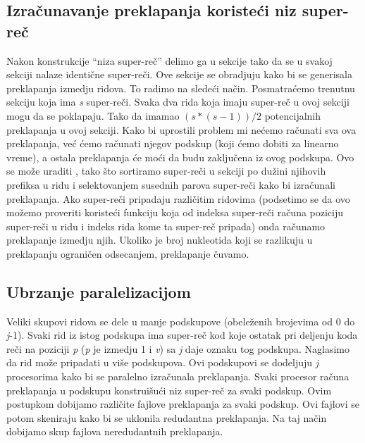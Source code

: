 \documentclass[a4paper]{article}
\begin{document}
{\subsection{Izračunavanje preklapanja koristeći niz super-reč}
\label{subsec:ipknsr}
\indent Nakon konstrukcije ``niza super-reč'' delimo ga u sekcije tako da se u svakoj sekciji nalaze identične super-reči. Ove sekcije se obradjuju kako bi se generisala preklapanja izmedju ridova. To radimo na sledeći način. Posmatraćemo trenutnu sekciju koja ima \textit{s} super-reči. Svaka dva rida koja imaju super-reč u ovoj sekciji mogu da se poklapaju. Tako da imamao \((s*(s-1))/2\) potencijalnih preklapanja u ovoj sekciji. Kako bi uprostili problem mi nećemo računati sva ova preklapanja, već ćemo računati njegov podskup (koji ćemo dobiti za linearno vreme), a ostala preklapanja će moći da budu zaključena iz ovog podskupa. Ovo se može uraditi , tako što sortiramo super-reči u sekciji po dužini njihovih prefiksa u ridu i selektovanjem susednih parova super-reči kako bi izračunali preklapanja. Ako super-reči pripadaju različitim ridovima (podsetimo se da ovo možemo proveriti koristeći funkciju koja od indeksa super-reči računa poziciju super-reči u ridu i indeks rida kome ta super-reč pripada) onda računamo preklapanje izmedju njih. Ukoliko je broj nukleotida koji se razlikuju u preklapanju ograničen odsecanjem, preklapanje čuvamo.
\subsection{Ubrzanje paralelizacijom}
\label{subsec:up}
Veliki skupovi ridova se dele u manje podskupove (obeleženih brojevima od 0 do \textit{j}-1). Svaki rid iz istog podskupa ima super-reč kod koje ostatak pri deljenju koda reči na poziciji \textit{p} (\textit{p} je izmedju 1 i \textit{v}) sa \textit{j} daje oznaku tog podskupa. Naglasimo da rid može pripadati u više podskupova. Ovi podskupovi se dodeljuju \textit{j} procesorima kako bi se  paralelno izračunala preklapanja. Svaki procesor računa preklapanja u podskupu konstruišući niz super-reč za svaki podskup. Ovim postupkom dobijamo različite fajlove preklapanja za svaki podskup. Ovi fajlovi se potom skeniraju kako bi se uklonila redudantna preklapanja. Na taj način dobijamo skup  fajlova neredudantnih preklapanja. 
}
\end{document}
